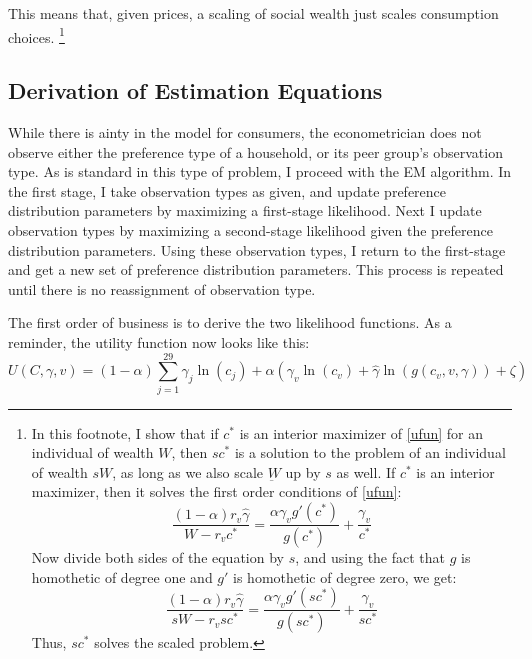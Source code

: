 \documentclass[12pt]{article}
\begin{document}
This means that, given prices, a scaling of social wealth just scales consumption choices.
\footnote{
In this footnote, I show that if $c^*$ is an interior maximizer of \eqref{ufun} for an individual of wealth $W$, then $s c^*$ is a solution to the  problem of an individual of wealth $s W$, as long as we also scale $\underbar{W}$ up by $s$ as well.
If $c^*$ is an interior maximizer, then it solves the first order conditions of \eqref{ufun}:
\[
\frac{(1-\alpha)r_v \hat{\gamma}}{W-r_v c^*} = \frac{\alpha \gamma_v g'(c^*)}{g(c^*)} + \frac{\gamma_v}{c^*}
\]
Now divide both sides of the equation by $s$, and using the fact that $g$ is homothetic of degree one and $g'$ is homothetic of degree zero, we get:
\[
\frac{(1-\alpha)r_v \hat{\gamma}}{s W-r_v s c^*} = \frac{\alpha \gamma_v g'(s c^*)}{g(s c^*)} + \frac{\gamma_v}{s c^*}
\]
Thus, $s c^*$ solves the scaled problem.
}
\subsection{Derivation of Estimation Equations}
While there is ainty in the model for consumers, the econometrician does not observe either the preference type of a household, or its peer group's observation type.
As is standard in this type of problem, I proceed with the EM algorithm.
In the first stage, I take observation types as given, and update preference distribution parameters by maximizing a first-stage likelihood.
Next I update observation types by maximizing a second-stage likelihood given the preference distribution parameters.
Using these observation types, I return to the first-stage and get a new set of preference distribution parameters.
This process is repeated until there is no reassignment of observation type.

The first order of business is to derive the two likelihood functions.
As a reminder, the utility function now looks like this:
\begin{equation}
	\label{totuti}
U(C,\gamma,v) = (1-\alpha) \sum_{j=1}^{29}\gamma_j \ln(c_j )  + \alpha \left(\gamma_v \ln(c_v)+ \hat{\gamma}\ln(g(c_v,v,\gamma))  + \zeta \right)
\end{equation}
\end{document}
